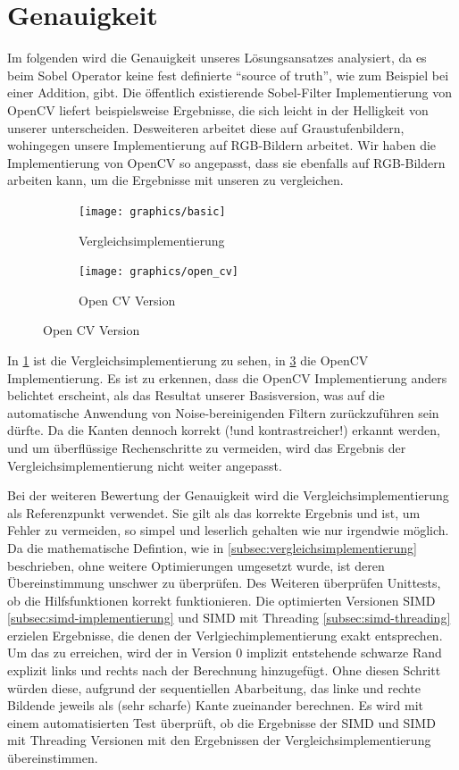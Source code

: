 \documentclass[course=erap]{aspdoc}
\begin{document}
\section{Genauigkeit}\label{sec:genauigkeit}
Im folgenden wird die Genauigkeit unseres Lösungsansatzes analysiert, da es beim Sobel Operator keine fest definierte \enquote{source of truth}, wie zum Beispiel bei einer Addition, gibt.
Die öffentlich existierende Sobel-Filter Implementierung von OpenCV liefert beispielsweise Ergebnisse, die sich leicht in der Helligkeit von unserer unterscheiden.
Desweiteren arbeitet diese auf Graustufenbildern, wohingegen unsere Implementierung auf RGB-Bildern arbeitet.
Wir haben die Implementierung von OpenCV so angepasst, dass sie ebenfalls auf RGB-Bildern arbeiten kann, um die Ergebnisse mit unseren zu vergleichen.
\begin{figure}[H]
    \begin{subfigure}{.5\columnwidth}
        \centering
        \texttt{[image: graphics/basic]}
        \caption{Vergleichsimplementierung}
        \label{fig:basic}
    \end{subfigure}
    \begin{subfigure}{.5\columnwidth}
        \centering
        \texttt{[image: graphics/open\_cv]}
        \caption{Open CV Version}
        \label{fig:opencv}
    \end{subfigure}
\end{figure}
In \ref{fig:basic} ist die Vergleichsimplementierung zu sehen, in \ref{fig:opencv} die OpenCV Implementierung.
Es ist zu erkennen, dass die OpenCV Implementierung anders belichtet erscheint, als das Resultat unserer Basisversion, was auf die automatische Anwendung von Noise-bereinigenden Filtern zurückzuführen sein dürfte.
Da die Kanten dennoch korrekt (!und kontrastreicher!) erkannt werden, und um überflüssige Rechenschritte zu vermeiden, wird das Ergebnis der Vergleichsimplementierung nicht weiter angepasst.

Bei der weiteren Bewertung der Genauigkeit wird die Vergleichsimplementierung als Referenzpunkt verwendet.
Sie gilt als das korrekte Ergebnis und ist, um Fehler zu vermeiden, so simpel und leserlich gehalten wie nur irgendwie möglich.
Da die mathematische Defintion, wie in \ref{subsec:vergleichsimplementierung} beschrieben, ohne weitere Optimierungen umgesetzt wurde, ist deren Übereinstimmung unschwer zu überprüfen.
Des Weiteren überprüfen Unittests, ob die Hilfsfunktionen korrekt funktionieren.
Die optimierten Versionen SIMD \ref{subsec:simd-implementierung} und SIMD mit Threading \ref{subsec:simd-threading} erzielen Ergebnisse, die denen der Verlgiechimplementierung exakt entsprechen.
Um das zu erreichen, wird der in Version 0 implizit entstehende schwarze Rand explizit links und rechts nach der Berechnung hinzugefügt.
Ohne diesen Schritt würden diese, aufgrund der sequentiellen Abarbeitung, das linke und rechte Bildende jeweils als (sehr scharfe) Kante zueinander berechnen.
Es wird mit einem automatisierten Test überprüft, ob die Ergebnisse der SIMD und SIMD mit Threading Versionen mit den Ergebnissen der Vergleichsimplementierung übereinstimmen.
\end{document}
